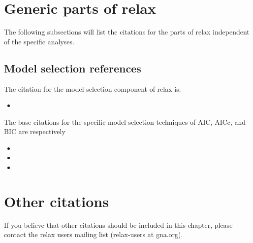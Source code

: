 \section*{Generic parts of relax}

The following subsections will list the citations for the parts of relax independent of the specific analyses.



\subsection*{Model selection references}

The citation for the model selection component of relax is:
\begin{itemize}
  \item {}
\end{itemize}

The base citations for the specific model selection techniques of AIC, AICc, and BIC are respectively \citet{Akaike73,HurvichTsai89,Schwarz78}
\begin{itemize}
  \item {}
  \item {}
  \item {}
\end{itemize}




\section*{Other citations}

If you believe that other citations should be included in this chapter, please contact the relax users mailing list (relax-users at gna.org).
